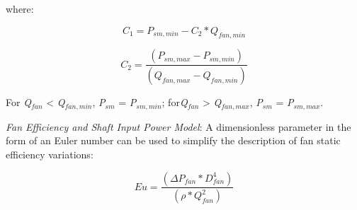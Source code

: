 where:

\begin{equation}
{C_1} = {P_{sm,min }} - {C_2}*{Q_{fan,min }}
\end{equation}

\begin{equation}
{C_2} = \frac{{\left( {{P_{sm,max }} - {P_{sm,min }}} \right)}}{{\left( {{Q_{fan,max }} - {Q_{fan,min }}} \right)}}
\end{equation}

For \emph{Q\(_{fan}\)} \textless{} \emph{Q\(_{fan,min}\)}, \emph{P\(_{sm}\)} = \emph{P\(_{sm,min}\)}; for\emph{Q\(_{fan}\)} \textgreater{} \emph{Q\(_{fan,max}\)}, \emph{P\(_{sm}\)} = \emph{P\(_{sm,max}\)}.

\emph{Fan Efficiency and Shaft Input Power Model}: A dimensionless parameter in the form of an Euler number can be used to simplify the description of fan static efficiency variations:

\begin{equation}
Eu = \frac{{\left( {\Delta {P_{fan}} * D_{fan}^4} \right)}}{{\left( {\rho * Q_{fan}^2} \right)}}
\label{eq:Eu535}
\end{equation}

